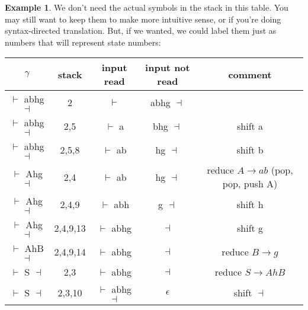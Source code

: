 \documentclass[]{article}
\theoremstyle{definition}
\newtheorem{ex}{Example}[section]
\begin{document}
\begin{ex}
						We don't need the actual symbols in the stack in this table. You may still want to keep them to make more intuitive sense, or if you're doing syntax-directed translation. But, if we wanted, we could label them just as numbers that will represent state numbers:
						\begin{center}
							\begin{tabular}{|c|c|c|c|c|}
								\hline
								$\gamma$ & stack & input read & input not read & comment \\ \hline
								$\vdash$ abhg $\dashv$ & 2 & $\vdash$ & abhg $\dashv$ & \\
								$\vdash$ abhg $\dashv$ & 2,5 & $\vdash$ a & bhg $\dashv$ & shift a \\
								$\vdash$ abhg $\dashv$ & 2,5,8 & $\vdash$ ab & hg $\dashv$ & shift b \\
								$\vdash$ Ahg $\dashv$ & 2,4 & $\vdash$ ab & hg $\dashv$ & reduce $A \to ab$ (pop, pop, push A) \\
								$\vdash$ Ahg $\dashv$ & 2,4,9 & $\vdash$ abh & g $\dashv$ & shift h \\
								$\vdash$ Ahg $\dashv$ & 2,4,9,13 & $\vdash$ abhg & $\dashv$ & shift g \\
								$\vdash$ AhB $\dashv$ & 2,4,9,14 & $\vdash$ abhg & $\dashv$ & reduce $B \to g$ \\
								$\vdash$ S $\dashv$ & 2,3 & $\vdash$ abhg & $\dashv$ & reduce $S \to AhB$ \\ 
								$\vdash$ S $\dashv$ & 2,3,10 & $\vdash$ abhg $\dashv$ & $\epsilon$ & shift $\dashv$ \\ \hline
							\end{tabular}
						\end{center}
						

\end{ex}
\end{document}
